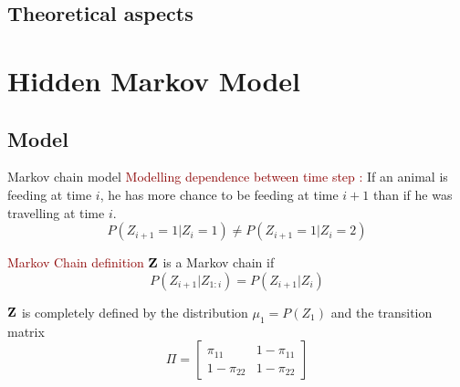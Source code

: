\documentclass{beamer}\usepackage[]{graphicx}\usepackage[]{color}
\newcommand{\emphase}[1]{\textcolor{darkred}{#1}}
\newcommand{\paragraph}[1]{\emphase{#1}}
\newcommand{\Zbf}{{\bf Z}}
\begin{document}
\subsection{Theoretical aspects}
\section{Hidden Markov Model}

\subsection{Model}
\begin{frame}{Markov chain model}
\paragraph{Modelling dependence between time step :}
If an animal is feeding at time $i$, he has more chance to be feeding at time $i+1$ than if he was travelling at time $i$.
$$P(Z_{i+1}=1 \vert Z_{i}=1) \ne P(Z_{i+1}=1 \vert Z_{i}=2)$$

\paragraph{Markov Chain definition}
$\Zbf$ is a Markov chain if 
$$P(Z_{i+1} \vert Z_{1:i}) =  P(Z_{i+1} \vert Z_{i})$$


$\Zbf$ is completely defined by the distribution $\mu_1=P(Z_1)$ and the transition matrix
$$\Pi =\left[\begin{matrix}
\pi_{11} & 1-\pi_{11}\\
1-\pi_{22} & 1-\pi_{22}
\end{matrix}\right]$$
\end{frame}
\end{document}
